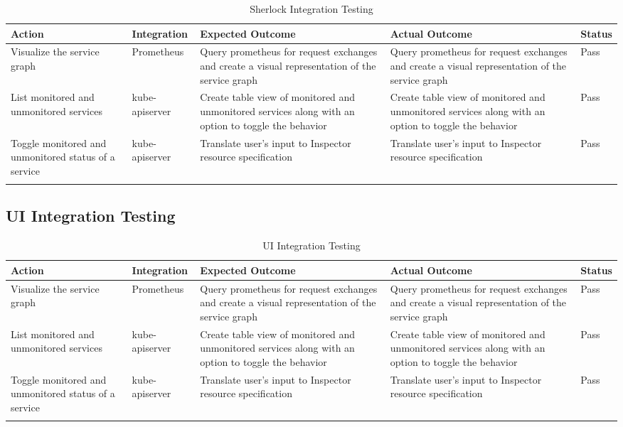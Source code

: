 \begin{longtable}{|p{30mm}|p{21mm}|p{40mm}|p{40mm}|p{10mm}|}
    \hline
    \textbf{Action} &
      \textbf{Integration} &
      \textbf{Expected Outcome} &
      \textbf{Actual Outcome} &
      \textbf{Status} \\ \hline
    Visualize the service graph &
      Prometheus &
      Query prometheus for request exchanges and create a visual representation of the service graph &
      Query prometheus for request exchanges and create a visual representation of the service graph &
      Pass \\ \hline
    List monitored and unmonitored services &
      kube-apiserver &
      Create table view of  monitored and unmonitored services along with an option to toggle the behavior &
      Create table view of  monitored and unmonitored services along with an option to toggle the behavior &
      Pass \\ \hline
    Toggle monitored and unmonitored status of a service &
      kube-apiserver &
      Translate user’s input to Inspector resource specification &
      Translate user’s input to Inspector resource specification &
      Pass \\ \hline
    \caption{Sherlock Integration Testing}
\end{longtable}

\subsection{UI Integration Testing}

\begin{longtable}{|p{30mm}|p{21mm}|p{40mm}|p{40mm}|p{10mm}|}
    \hline
    \textbf{Action} &
      \textbf{Integration} &
      \textbf{Expected Outcome} &
      \textbf{Actual Outcome} &
      \textbf{Status} \\ \hline
    Visualize the service graph &
      Prometheus &
      Query prometheus for request exchanges and create a visual representation of the service graph &
      Query prometheus for request exchanges and create a visual representation of the service graph &
      Pass \\ \hline
    List monitored and unmonitored services &
      kube-apiserver &
      Create table view of  monitored and unmonitored services along with an option to toggle the behavior &
      Create table view of  monitored and unmonitored services along with an option to toggle the behavior &
      Pass \\ \hline
    Toggle monitored and unmonitored status of a service &
      kube-apiserver &
      Translate user’s input to Inspector resource specification &
      Translate user’s input to Inspector resource specification &
      Pass \\ \hline
    \caption{UI Integration Testing}
\end{longtable}
